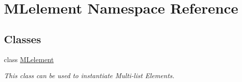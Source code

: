 \hypertarget{namespace_m_lelement}{}\section{M\+Lelement Namespace Reference}
\label{namespace_m_lelement}
\subsection*{Classes}
\begin{DoxyCompactItemize}
\item 
class \hyperlink{class_m_lelement_1_1_m_lelement}{M\+Lelement}
\begin{DoxyCompactList}\small\item\em This class can be used to instantiate Multi-\/list Elements. \end{DoxyCompactList}\end{DoxyCompactItemize}
